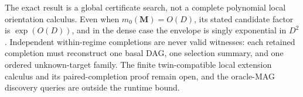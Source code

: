 The exact result is a global certificate search, not a complete polynomial local orientation calculus.  Even when \(m_0(\mathbf M)=O(D)\), its stated candidate factor is \(\exp(O(D))\), and in the dense case the envelope is singly exponential in \(D^2\).  Independent within-regime completions are never valid witnesses: each retained completion must reconstruct one basal DAG, one selection summary, and one ordered unknown-target family.  The finite twin-compatible local extension calculus and its paired-completion proof remain open, and the oracle-MAG discovery queries are outside the runtime bound.